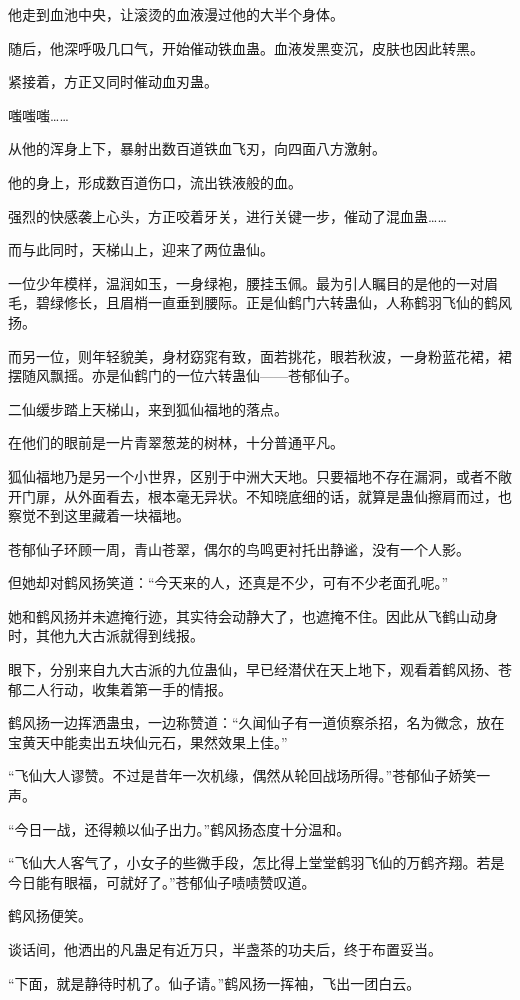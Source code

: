 \begin{this_body}
他走到血池中央，让滚烫的血液漫过他的大半个身体。

随后，他深呼吸几口气，开始催动铁血蛊。血液发黑变沉，皮肤也因此转黑。

紧接着，方正又同时催动血刃蛊。

嗤嗤嗤……

从他的浑身上下，暴射出数百道铁血飞刃，向四面八方激射。

他的身上，形成数百道伤口，流出铁液般的血。

强烈的快感袭上心头，方正咬着牙关，进行关键一步，催动了混血蛊……

而与此同时，天梯山上，迎来了两位蛊仙。

一位少年模样，温润如玉，一身绿袍，腰挂玉佩。最为引人瞩目的是他的一对眉毛，碧绿修长，且眉梢一直垂到腰际。正是仙鹤门六转蛊仙，人称鹤羽飞仙的鹤风扬。

而另一位，则年轻貌美，身材窈窕有致，面若挑花，眼若秋波，一身粉蓝花裙，裙摆随风飘摇。亦是仙鹤门的一位六转蛊仙——苍郁仙子。

二仙缓步踏上天梯山，来到狐仙福地的落点。

在他们的眼前是一片青翠葱茏的树林，十分普通平凡。

狐仙福地乃是另一个小世界，区别于中洲大天地。只要福地不存在漏洞，或者不敞开门扉，从外面看去，根本毫无异状。不知晓底细的话，就算是蛊仙擦肩而过，也察觉不到这里藏着一块福地。

苍郁仙子环顾一周，青山苍翠，偶尔的鸟鸣更衬托出静谧，没有一个人影。

但她却对鹤风扬笑道：“今天来的人，还真是不少，可有不少老面孔呢。”

她和鹤风扬并未遮掩行迹，其实待会动静大了，也遮掩不住。因此从飞鹤山动身时，其他九大古派就得到线报。

眼下，分别来自九大古派的九位蛊仙，早已经潜伏在天上地下，观看着鹤风扬、苍郁二人行动，收集着第一手的情报。

鹤风扬一边挥洒蛊虫，一边称赞道：“久闻仙子有一道侦察杀招，名为微念，放在宝黄天中能卖出五块仙元石，果然效果上佳。”

“飞仙大人谬赞。不过是昔年一次机缘，偶然从轮回战场所得。”苍郁仙子娇笑一声。

“今日一战，还得赖以仙子出力。”鹤风扬态度十分温和。

“飞仙大人客气了，小女子的些微手段，怎比得上堂堂鹤羽飞仙的万鹤齐翔。若是今日能有眼福，可就好了。”苍郁仙子啧啧赞叹道。

鹤风扬便笑。

谈话间，他洒出的凡蛊足有近万只，半盏茶的功夫后，终于布置妥当。

“下面，就是静待时机了。仙子请。”鹤风扬一挥袖，飞出一团白云。


\end{this_body}
